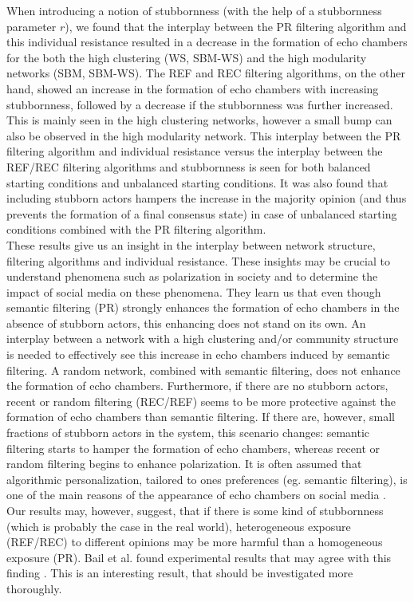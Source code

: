 \documentclass[11 pt , letterpaper , twoside , openright]{book}
\begin{document}
When introducing a notion of stubbornness (with the help of a stubbornness parameter $r$), we found that the interplay between the PR filtering algorithm and this individual resistance resulted in a decrease in the formation of echo chambers for the both the high clustering (WS, SBM-WS) and the high modularity networks (SBM, SBM-WS). The REF and REC filtering algorithms, on the other hand, showed an increase in the formation of echo chambers with increasing stubbornness, followed by a decrease if the stubbornness was further increased. This is mainly seen in the high clustering networks, however a small bump can also be observed in the high modularity network. This interplay between the PR filtering algorithm and individual resistance versus the interplay between the REF/REC filtering algorithms and stubbornness is seen for both balanced starting conditions and unbalanced starting conditions. It was also found that including stubborn actors hampers the increase in the majority opinion (and thus prevents the formation of a final consensus state) in case of unbalanced starting conditions combined with the PR filtering algorithm.\\
\newline
These results give us an insight in the interplay between network structure, filtering algorithms and individual resistance. These insights may be crucial to understand phenomena such as polarization in society and to determine the impact of social media on these phenomena. They learn us that even though semantic filtering (PR) strongly enhances the formation of echo chambers in the absence of stubborn actors, this enhancing does not stand on its own. An interplay between a network with a high clustering and/or community structure is needed to effectively see this increase in echo chambers induced by semantic filtering. A random network, combined with semantic filtering, does not enhance the formation of echo chambers. Furthermore, if there are no stubborn actors, recent or random filtering (REC/REF) seems to be more protective against the formation of echo chambers than semantic filtering. If there are, however, small fractions of stubborn actors in the system, this scenario changes: semantic filtering starts to hamper the formation of echo chambers, whereas recent or random filtering begins to enhance polarization. It is often assumed that algorithmic personalization, tailored to ones preferences (eg. semantic filtering), is one of the main reasons of the appearance of echo chambers on social media \cite{Ge2020}\cite{Mohseni2018}\cite{Stark2020}. Our results may, however, suggest, that if there is some kind of stubbornness (which is probably the case in the real world), heterogeneous exposure (REF/REC) to different opinions may be more harmful than a homogeneous exposure (PR). Bail et al. found experimental results that may agree with this finding \cite{Bail2018}. This is an interesting result, that should be investigated more thoroughly.\\
\end{document}
